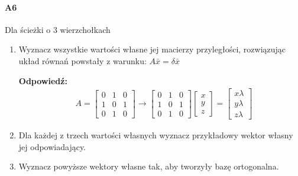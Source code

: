 \documentclass[a4paper,12pt]{article}
\theoremstyle{definition}%
\theoremstyle{definition}
\theoremstyle{problem}
\begin{document}
\paragraph{A6} Dla ścieżki o $3$ wierzchołkach
\begin{enumerate}[label=\alph*)]
\item Wyznacz wszystkie wartości własne jej macierzy przyległości, rozwiązując układ równań powstały z warunku: $A\bar{x}=\delta \bar{x}$

\textbf{Odpowiedź: }\begin{align*}
& A=\begin{bmatrix}
0&1&0\\1&0&1\\0&1&0
\end{bmatrix}\rightarrow \begin{bmatrix}
0&1&0\\1&0&1\\0&1&0
\end{bmatrix} \begin{bmatrix}
x\\y\\z
\end{bmatrix} = \begin{bmatrix}
x\lambda \\y\lambda \\z\lambda 
\end{bmatrix}
\end{align*}

\item Dla każdej z trzech wartości własnych wyznacz przykładowy wektor własny jej odpowiadający.
\item Wyznacz powyższe wektory własne tak, aby tworzyły bazę ortogonalna. 
\end{enumerate}
\end{document}
